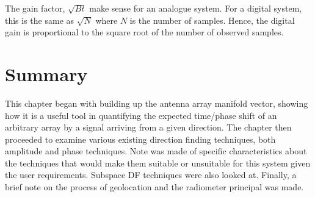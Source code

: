 The gain factor, \(\sqrt{Bt}\) make sense for an analogue system. For a digital system, this is the same as \(\sqrt{N}\) where \(N\) is the number of samples. Hence, the digital gain is proportional to the square root of the number of observed samples.

\section{Summary}
This chapter began with building up the antenna array manifold vector, showing how it is a useful tool in quantifying the expected time/phase shift of an arbitrary array by a signal arriving from a given direction. The chapter then proceeded to examine various existing direction finding techniques, both amplitude and phase techniques. Note was made of specific characteristics about the techniques that would make them suitable or unsuitable for this system given the user requirements. Subspace DF techniques were also looked at. Finally, a brief note on the process of geolocation and the radiometer principal was made.
